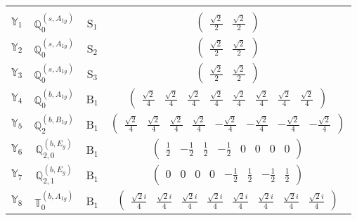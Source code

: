 \documentclass[fleqn,10pt,landscape]{article}
\begin{document}
\begin{itemize}
\begin{center}
\begin{longtable}{c|c|c|c}
 \hline \hline
\multicolumn{3}{r}{} \\ \endlastfoot

$ \mathbb{Y}_{1} $ & $\mathbb{Q}_{0}^{(s,A_{1g})}$ & S$_{1}$ & $\begin{pmatrix} \frac{\sqrt{2}}{2} & \frac{\sqrt{2}}{2} \end{pmatrix}$ \\ \hline
$ \mathbb{Y}_{2} $ & $\mathbb{Q}_{0}^{(s,A_{1g})}$ & S$_{2}$ & $\begin{pmatrix} \frac{\sqrt{2}}{2} & \frac{\sqrt{2}}{2} \end{pmatrix}$ \\ \hline
$ \mathbb{Y}_{3} $ & $\mathbb{Q}_{0}^{(s,A_{1g})}$ & S$_{3}$ & $\begin{pmatrix} \frac{\sqrt{2}}{2} & \frac{\sqrt{2}}{2} \end{pmatrix}$ \\ \hline
$ \mathbb{Y}_{4} $ & $\mathbb{Q}_{0}^{(b,A_{1g})}$ & B$_{1}$ & $\begin{pmatrix} \frac{\sqrt{2}}{4} & \frac{\sqrt{2}}{4} & \frac{\sqrt{2}}{4} & \frac{\sqrt{2}}{4} & \frac{\sqrt{2}}{4} & \frac{\sqrt{2}}{4} & \frac{\sqrt{2}}{4} & \frac{\sqrt{2}}{4} \end{pmatrix}$ \\
$ \mathbb{Y}_{5} $ & $\mathbb{Q}_{2}^{(b,B_{1g})}$ & B$_{1}$ & $\begin{pmatrix} \frac{\sqrt{2}}{4} & \frac{\sqrt{2}}{4} & \frac{\sqrt{2}}{4} & \frac{\sqrt{2}}{4} & - \frac{\sqrt{2}}{4} & - \frac{\sqrt{2}}{4} & - \frac{\sqrt{2}}{4} & - \frac{\sqrt{2}}{4} \end{pmatrix}$ \\
$ \mathbb{Y}_{6} $ & $\mathbb{Q}_{2,0}^{(b,E_{g})}$ & B$_{1}$ & $\begin{pmatrix} \frac{1}{2} & - \frac{1}{2} & \frac{1}{2} & - \frac{1}{2} & 0 & 0 & 0 & 0 \end{pmatrix}$ \\
$ \mathbb{Y}_{7} $ & $\mathbb{Q}_{2,1}^{(b,E_{g})}$ & B$_{1}$ & $\begin{pmatrix} 0 & 0 & 0 & 0 & - \frac{1}{2} & \frac{1}{2} & - \frac{1}{2} & \frac{1}{2} \end{pmatrix}$ \\
$ \mathbb{Y}_{8} $ & $\mathbb{T}_{0}^{(b,A_{1g})}$ & B$_{1}$ & $\begin{pmatrix} \frac{\sqrt{2} i}{4} & \frac{\sqrt{2} i}{4} & \frac{\sqrt{2} i}{4} & \frac{\sqrt{2} i}{4} & \frac{\sqrt{2} i}{4} & \frac{\sqrt{2} i}{4} & \frac{\sqrt{2} i}{4} & \frac{\sqrt{2} i}{4} \end{pmatrix}$ \\

\end{longtable}
\end{center}
\end{itemize}
\end{document}
